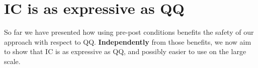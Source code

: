 %
%
%
%
%
%







\section{IC is as expressive as QQ}
\label{s:pattern1}
So far we have presented how using pre-post conditions benefits the safety of our approach 
with respect to QQ.
\textbf{Independently} from those benefits, 
we now aim to show that IC is as expressive as QQ, and possibly easier to use on the large scale.

